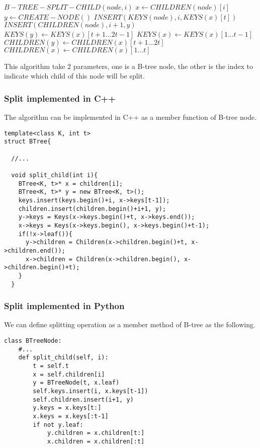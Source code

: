 \documentclass{article}
\begin{document}
\begin{algorithmic}
\STATE $B-TREE-SPLIT-CHILD(node, i)$
  \STATE $x \leftarrow CHILDREN(node)[i]$
  \STATE $y \leftarrow CREATE-NODE()$
  \STATE $INSERT(KEYS(node), i, KEYS(x)[t])$
  \STATE $INSERT(CHILDREN(node), i+1, y)$
  \STATE $KEYS(y) \leftarrow KEYS(x)[t+1 ... 2t-1]$
  \STATE $KEYS(x) \leftarrow KEYS(x)[1 ... t-1]$
    \STATE $CHILDREN(y) \leftarrow CHILDREN(x)[t+1 ... 2t]$
    \STATE $CHILDREN(x) \leftarrow CHILDREN(x)[1 ... t]$
  \ENDIF
\end{algorithmic}

This algorithm take 2 parameters, one is a B-tree node, the other
is the index to indicate which child of this node will be split.

\subsubsection*{Split implemented in C++}
The algorithm can be implemented in C++ as a member function of
B-tree node.

\lstset{language=C++}
\begin{lstlisting}
template<class K, int t>
struct BTree{

  //...

  void split_child(int i){
    BTree<K, t>* x = children[i];
    BTree<K, t>* y = new BTree<K, t>();
    keys.insert(keys.begin()+i, x->keys[t-1]);
    children.insert(children.begin()+i+1, y);
    y->keys = Keys(x->keys.begin()+t, x->keys.end());
    x->keys = Keys(x->keys.begin(), x->keys.begin()+t-1);
    if(!x->leaf()){
      y->children = Children(x->children.begin()+t, x->children.end());
      x->children = Children(x->children.begin(), x->children.begin()+t);
    }
  }
\end{lstlisting}

\subsubsection*{Split implemented in Python}
We can define splitting operation as a member method of B-tree
as the following.

\lstset{language=Python}
\begin{lstlisting}
class BTreeNode:
    #...
    def split_child(self, i):
        t = self.t
        x = self.children[i]
        y = BTreeNode(t, x.leaf)
        self.keys.insert(i, x.keys[t-1])
        self.children.insert(i+1, y)
        y.keys = x.keys[t:]
        x.keys = x.keys[:t-1]
        if not y.leaf:
            y.children = x.children[t:]
            x.children = x.children[:t]
\end{lstlisting}
\end{document}
